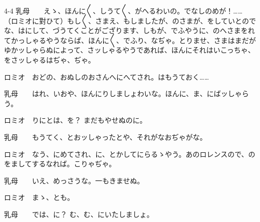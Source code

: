 \documentclass[tate,paper=b6j,jafontsize=9pt]{jlreq}
\begin{document}
\begin{azconvIndented}{4\zw}{-4\zw}
乳母　　えゝ、ほんに{〳〵}、しうて{〳〵}、がへるわいの。でなしのめが！……（ロミオに對ひて）もし{〳〵}、さまえ、もしましたが、のさまが、をしていとのでな、はにして、づうてくことがござります、しもが、でふやうに、のへさまをれてかっしゃるやうならば、ほんに{〳〵}、でふり、なぢゃ。とりませ、さまはまだがゆかッしゃらぬによって、さッしゃるやうであれば、ほんにそれはいこっちゃ、をさッしゃるはぢゃ、ぢゃ。

ロミオ　おどの、おぬしのおさんへにへてされ。はもうておく……

乳母　　はれ、いおや、ほんにりしましょわいな。ほんに、ま、にばッしゃらう。

ロミオ　りにとは、を？ まだもやせぬのに。

乳母　　もうてく、とおッしゃったとや、それがなおぢゃがな。

ロミオ　なう、にめてされ、に、とかしてにらるゝやう。あのロレンスので、のをましてするなれば。こりゃぢゃ。

乳母　　いえ、めっさうな。一もきませぬ。

ロミオ　まゝ、とも。

乳母　　では、に？ む、む、にいたしましょ。

\end{azconvIndented}
\end{document}

